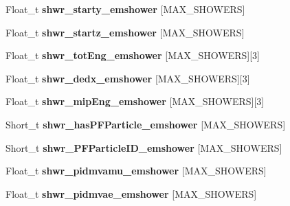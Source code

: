\begin{DoxyCompactItemize}
\item 
\hypertarget{classanatree_ac370306b31632d3a3790081998d86dae}{Float\-\_\-t {\bfseries shwr\-\_\-starty\-\_\-emshower} \mbox{[}M\-A\-X\-\_\-\-S\-H\-O\-W\-E\-R\-S\mbox{]}}\label{classanatree_ac370306b31632d3a3790081998d86dae}

\item 
\hypertarget{classanatree_a0f1f0fe9cceeb189a3366ca4afbb6f9f}{Float\-\_\-t {\bfseries shwr\-\_\-startz\-\_\-emshower} \mbox{[}M\-A\-X\-\_\-\-S\-H\-O\-W\-E\-R\-S\mbox{]}}\label{classanatree_a0f1f0fe9cceeb189a3366ca4afbb6f9f}

\item 
\hypertarget{classanatree_a284ba0af819815e92479c6c97377924b}{Float\-\_\-t {\bfseries shwr\-\_\-tot\-Eng\-\_\-emshower} \mbox{[}M\-A\-X\-\_\-\-S\-H\-O\-W\-E\-R\-S\mbox{]}\mbox{[}3\mbox{]}}\label{classanatree_a284ba0af819815e92479c6c97377924b}

\item 
\hypertarget{classanatree_a5a2edbdec9937f0591074ec227fdc7a3}{Float\-\_\-t {\bfseries shwr\-\_\-dedx\-\_\-emshower} \mbox{[}M\-A\-X\-\_\-\-S\-H\-O\-W\-E\-R\-S\mbox{]}\mbox{[}3\mbox{]}}\label{classanatree_a5a2edbdec9937f0591074ec227fdc7a3}

\item 
\hypertarget{classanatree_aef23f9da33311f1e7a1382be85a425f9}{Float\-\_\-t {\bfseries shwr\-\_\-mip\-Eng\-\_\-emshower} \mbox{[}M\-A\-X\-\_\-\-S\-H\-O\-W\-E\-R\-S\mbox{]}\mbox{[}3\mbox{]}}\label{classanatree_aef23f9da33311f1e7a1382be85a425f9}

\item 
\hypertarget{classanatree_ae847c0b22deb9dd4bb227ec90e1c4a03}{Short\-\_\-t {\bfseries shwr\-\_\-has\-P\-F\-Particle\-\_\-emshower} \mbox{[}M\-A\-X\-\_\-\-S\-H\-O\-W\-E\-R\-S\mbox{]}}\label{classanatree_ae847c0b22deb9dd4bb227ec90e1c4a03}

\item 
\hypertarget{classanatree_ad6193b7b49d7827a3f35511da315daeb}{Short\-\_\-t {\bfseries shwr\-\_\-\-P\-F\-Particle\-I\-D\-\_\-emshower} \mbox{[}M\-A\-X\-\_\-\-S\-H\-O\-W\-E\-R\-S\mbox{]}}\label{classanatree_ad6193b7b49d7827a3f35511da315daeb}

\item 
\hypertarget{classanatree_a73a0b351b3500cf71010cfc14920165f}{Float\-\_\-t {\bfseries shwr\-\_\-pidmvamu\-\_\-emshower} \mbox{[}M\-A\-X\-\_\-\-S\-H\-O\-W\-E\-R\-S\mbox{]}}\label{classanatree_a73a0b351b3500cf71010cfc14920165f}

\item 
\hypertarget{classanatree_aded5848a28c2143f3f99af58b7c303e1}{Float\-\_\-t {\bfseries shwr\-\_\-pidmvae\-\_\-emshower} \mbox{[}M\-A\-X\-\_\-\-S\-H\-O\-W\-E\-R\-S\mbox{]}}\label{classanatree_aded5848a28c2143f3f99af58b7c303e1}


\end{DoxyCompactItemize}
